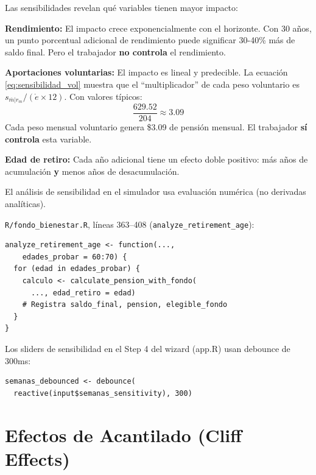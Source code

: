 \documentclass[11pt,a4paper]{report}
\theoremstyle{remark}
\begin{document}
\begin{tcolorbox}[colback=green!5!white, colframe=green!50!black, title=\textbf{Intuici\'on}]
Las sensibilidades revelan qu\'e variables tienen mayor impacto:

\textbf{Rendimiento:} El impacto crece exponencialmente con el horizonte. Con 30 a\~nos, un punto porcentual adicional de rendimiento puede significar 30-40\% m\'as de saldo final. Pero el trabajador \textbf{no controla} el rendimiento.

\textbf{Aportaciones voluntarias:} El impacto es lineal y predecible. La ecuaci\'on \eqref{eq:sensibilidad_vol} muestra que el ``multiplicador'' de cada peso voluntario es $s_{\overline{m}|r_m} / (\mathring{e} \times 12)$. Con valores t\'ipicos:
\[
\frac{629.52}{204} \approx 3.09
\]
Cada peso mensual voluntario genera \$3.09 de pensi\'on mensual. El trabajador \textbf{s\'i controla} esta variable.

\textbf{Edad de retiro:} Cada a\~no adicional tiene un efecto doble positivo: m\'as a\~nos de acumulaci\'on \textbf{y} menos a\~nos de desacumulaci\'on.
\end{tcolorbox}

\begin{tcolorbox}[colback=orange!5!white, colframe=orange!75!black, title=\textbf{Aplicaci\'on en C\'odigo}]
El an\'alisis de sensibilidad en el simulador usa evaluaci\'on num\'erica (no derivadas anal\'iticas).

\texttt{R/fondo\_bienestar.R}, l\'ineas 363--408 (\texttt{analyze\_retirement\_age}):
\begin{lstlisting}
analyze_retirement_age <- function(...,
    edades_probar = 60:70) {
  for (edad in edades_probar) {
    calculo <- calculate_pension_with_fondo(
      ..., edad_retiro = edad)
    # Registra saldo_final, pension, elegible_fondo
  }
}
\end{lstlisting}

Los sliders de sensibilidad en el Step 4 del wizard (app.R) usan debounce de 300ms:
\begin{lstlisting}
semanas_debounced <- debounce(
  reactive(input$semanas_sensitivity), 300)
\end{lstlisting}
\end{tcolorbox}

\section{Efectos de Acantilado (Cliff Effects)}
\end{document}
